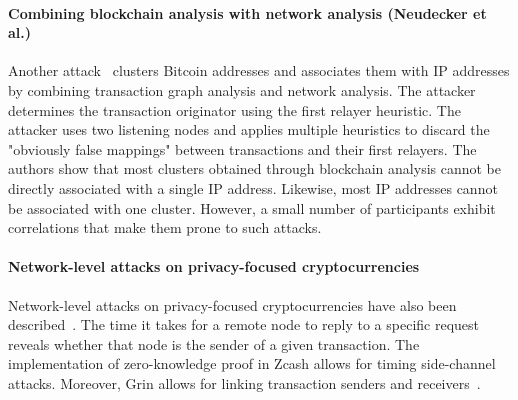 \paragraph{Combining blockchain analysis with network analysis (Neudecker et al.)}

Another attack~\cite{Neudecker2017} clusters Bitcoin addresses and associates them with IP addresses by combining transaction graph analysis and network analysis.
The attacker determines the transaction originator using the first relayer heuristic.
The attacker uses two listening nodes and applies multiple heuristics to discard the "obviously false mappings" between transactions and their first relayers.
The authors show that most clusters obtained through blockchain analysis cannot be directly associated with a single IP address.
Likewise, most IP addresses cannot be associated with one cluster.
However, a small number of participants exhibit correlations that make them prone to such attacks.


\paragraph{Network-level attacks on privacy-focused cryptocurrencies}

Network-level attacks on privacy-focused cryptocurrencies have also been described~\cite{Tramer2020}.
The time it takes for a remote node to reply to a specific request reveals whether that node is the sender of a given transaction.
The implementation of zero-knowledge proof in Zcash allows for timing side-channel attacks.
Moreover, Grin allows for linking transaction senders and receivers~\cite{Bogatyy2019}.
